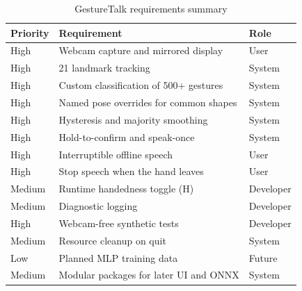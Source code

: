 \begin{table}[H]
\centering
\small
\caption{GestureTalk requirements summary}
\label{tab:req}
\begin{tabularx}{\textwidth}{@{}l L l@{}}
\toprule
\textbf{Priority} & \textbf{Requirement} & \textbf{Role} \\
\midrule
High & Webcam capture and mirrored display & User \\
High & 21 landmark tracking & System \\
High & Custom classification of 500+ gestures & System \\
High & Named pose overrides for common shapes & System \\
High & Hysteresis and majority smoothing & System \\
High & Hold-to-confirm and speak-once & System \\
High & Interruptible offline speech & User \\
High & Stop speech when the hand leaves & User \\
Medium & Runtime handedness toggle (H) & Developer \\
Medium & Diagnostic logging & Developer \\
High & Webcam-free synthetic tests & Developer \\
Medium & Resource cleanup on quit & System \\
Low & Planned MLP training data & Future \\
Medium & Modular packages for later UI and ONNX & System \\
\bottomrule
\end{tabularx}
\end{table}
